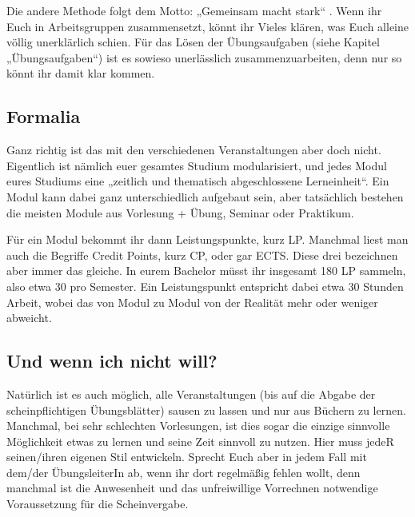 Die andere Methode folgt dem Motto: „Gemeinsam macht stark“ . Wenn ihr Euch in
Arbeitsgruppen zusammensetzt, könnt ihr Vieles klären, was Euch alleine völlig
unerklärlich schien. Für das Lösen der Übungsaufgaben (siehe Kapitel
„Übungsaufgaben“) ist es sowieso unerlässlich zusammenzuarbeiten, denn nur so
könnt ihr damit klar kommen.

\subsection{Formalia}
Ganz richtig ist das mit den verschiedenen Veranstaltungen aber doch nicht.
Eigentlich ist nämlich euer gesamtes Studium modularisiert, und jedes Modul
eures Studiums eine „zeitlich und thematisch abgeschlossene Lerneinheit“.
Ein Modul kann dabei ganz unterschiedlich aufgebaut sein, aber tatsächlich
bestehen die meisten Module aus Vorlesung + Übung, Seminar oder Praktikum.

Für ein Modul bekommt ihr dann Leistungspunkte, kurz \gls{LP}.
Manchmal liest man auch die Begriffe Credit Points, kurz \gls{CP}, oder gar
\gls{ECTS}.  Diese drei bezeichnen aber immer das gleiche.  In eurem Bachelor
müsst ihr insgesamt 180 \gls{LP} sammeln, also etwa 30 pro Semester.  Ein
Leistungspunkt entspricht dabei etwa 30 Stunden Arbeit, wobei das von Modul zu
Modul von der Realität mehr oder weniger abweicht.

\subsection{Und wenn ich nicht will?}
Natürlich ist es auch möglich, alle Veranstaltungen (bis auf die Abgabe der scheinpflichtigen Übungsblätter) sausen zu lassen und nur aus Büchern zu lernen. Manchmal, bei sehr schlechten Vorlesungen, ist dies sogar die einzige sinnvolle Möglichkeit etwas zu lernen und seine Zeit sinnvoll zu nutzen. Hier muss jedeR seinen/ihren eigenen Stil entwickeln. Sprecht Euch aber in jedem Fall mit dem/der ÜbungsleiterIn ab, wenn ihr dort regelmäßig fehlen wollt, denn manchmal ist die Anwesenheit und das unfreiwillige Vorrechnen notwendige Voraussetzung für die Scheinvergabe.
